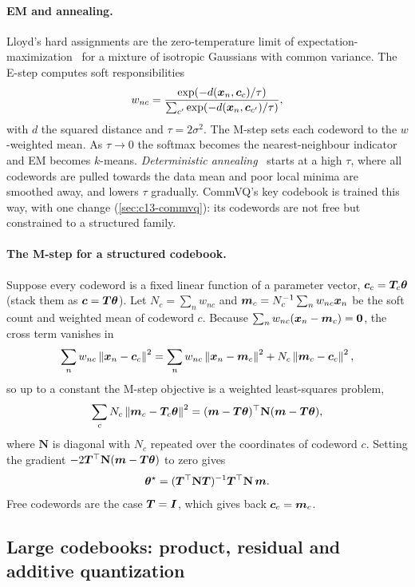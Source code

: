 \paragraph{EM and annealing.} Lloyd's hard assignments are the zero-temperature limit of
expectation-maximization~\citep{c13-dempster1977} for a mixture of isotropic Gaussians with common
variance. The E-step computes soft responsibilities
\begin{equation}\label{eq:c13-estep}
  w_{nc} = \frac{\exp(-d(\bm{x}_n,\bm{c}_c)/\tau)}{\sum_{c'}\exp(-d(\bm{x}_n,\bm{c}_{c'})/\tau)} ,
\end{equation}
with $d$ the squared distance and $\tau=2\sigma^2$. The M-step sets each codeword to the
$w$-weighted mean. As $\tau\to0$ the softmax becomes the nearest-neighbour indicator and EM becomes
$k$-means. \emph{Deterministic annealing}~\citep{c13-rose1998da} starts at a high $\tau$, where all
codewords are pulled towards the data mean and poor local minima are smoothed away, and lowers $\tau$
gradually. CommVQ's key codebook is trained this way, with one change (\cref{sec:c13-commvq}): its
codewords are not free but constrained to a structured family.

\paragraph{The M-step for a structured codebook.} Suppose every codeword is a fixed linear function of
a parameter vector, $\bm{c}_c=\bm{T}_c\bm{\theta}$ (stack them as $\bm{c}=\bm{T}\bm{\theta}$). Let
$N_c=\sum_nw_{nc}$ and $\bm{m}_c=N_c^{-1}\sum_nw_{nc}\bm{x}_n$ be the soft count and weighted mean of
codeword $c$. Because $\sum_nw_{nc}(\bm{x}_n-\bm{m}_c)=\bm{0}$, the cross term vanishes in
\[
  \sum_n w_{nc}\left\lVert \bm{x}_n-\bm{c}_c\right\rVert^2 = \sum_n w_{nc}\left\lVert \bm{x}_n-\bm{m}_c\right\rVert^2 + N_c\left\lVert \bm{m}_c-\bm{c}_c\right\rVert^2 ,
\]
so up to a constant the M-step objective is a weighted least-squares problem,
\[
  \sum_cN_c\left\lVert \bm{m}_c-\bm{T}_c\bm{\theta}\right\rVert^2=(\bm{m}-\bm{T}\bm{\theta})^{\top}\mathbf{N}(\bm{m}-\bm{T}\bm{\theta}),
\]
where $\mathbf{N}$ is diagonal with $N_c$ repeated over the coordinates of codeword $c$. Setting the gradient
$-2\bm{T}^{\top}\mathbf{N}(\bm{m}-\bm{T}\bm{\theta})$ to zero gives
\begin{equation}\label{eq:c13-structured-mstep}
  \bm{\theta}^\star = (\bm{T}^{\top}\mathbf{N}\bm{T})^{-1}\bm{T}^{\top}\mathbf{N}\,\bm{m} .
\end{equation}
Free codewords are the case $\bm{T}=\bm{I}$, which gives back $\bm{c}_c=\bm{m}_c$.

\subsection{Large codebooks: product, residual and additive quantization}\label{sec:c13-rvq}


